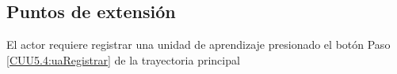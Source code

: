 	\subsection{Puntos de extensión}
	
	\UCExtensionPoint
	{El actor requiere registrar una unidad de aprendizaje presionado el botón }
	{ Paso \ref{CUU5.4:uaRegistrar} de la trayectoria principal}
	{}
	

	
	
	
	
